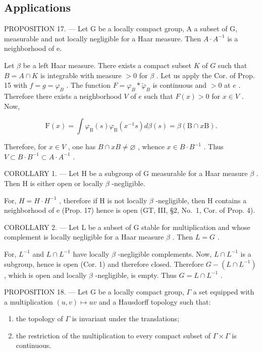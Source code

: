 \subsection{Applications}

PROPOSITION 17. --- Let G be a locally compact group, A a subset of G, measurable and not locally negligible for a Haar measure. Then \(A \cdot A^{-1}\) is a neighborhood of e.

Let \(\beta\) be a left Haar measure. There exists a compact subset \(K\) of \(G\) such that \(B = A \cap K\) is integrable with measure \(>0\) for \(\beta\) . Let us apply the Cor. of Prop. 15 with \(f = g = \varphi_{B}\) . The function \(F = \varphi_{B} * \check{\varphi}_{B}\) is continuous and \(>0\) at \(e\) . Therefore there exists a neighborhood \(V\) of \(e\) such that \(F(x) > 0\) for \(x \in V\) . Now,

\[
\mathrm{F} (x) = \int \varphi_ {\mathrm{B}} (s) \varphi_ {\mathrm{B}} (x ^ {- 1} s) d \beta (s) = \beta (\mathrm{B} \cap x \mathrm{B}).
\]

Therefore, for \(x \in V\) , one has \(B \cap xB \neq \varnothing\) , whence \(x \in B \cdot B^{-1}\) . Thus \(V \subset B \cdot B^{-1} \subset A \cdot A^{-1}\) .

COROLLARY 1. --- Let H be a subgroup of G measurable for a Haar measure \(\beta\) . Then H is either open or locally \(\beta\) -negligible.

For, \(H = H \cdot H^{-1}\) , therefore if H is not locally \(\beta\) -negligible, then H contains a neighborhood of e (Prop. 17) hence is open (GT, III, §2, No.~1, Cor. of Prop. 4).

COROLLARY 2. --- Let L be a subset of G stable for multiplication and whose complement is locally negligible for a Haar measure \(\beta\) . Then \(L = G\) .

For, \(L^{-1}\) and \(L \cap L^{-1}\) have locally \(\beta\) -negligible complements. Now, \(L \cap L^{-1}\) is a subgroup, hence is open (Cor. 1) and therefore closed. Therefore \(G - (L \cap L^{-1})\) , which is open and locally \(\beta\) -negligible, is empty. Thus \(G = L \cap L^{-1}\) .

PROPOSITION 18. --- Let G be a locally compact group, \(\Gamma\) a set equipped with a multiplication \((u,v)\mapsto uv\) and a Hausdorff topology such that:

\begin{enumerate}
\def\labelenumi{\arabic{enumi})}
\item
  the topology of \(\Gamma\) is invariant under the translations;
\item
  the restriction of the multiplication to every compact subset of \(\Gamma \times \Gamma\) is continuous.
\end{enumerate}

